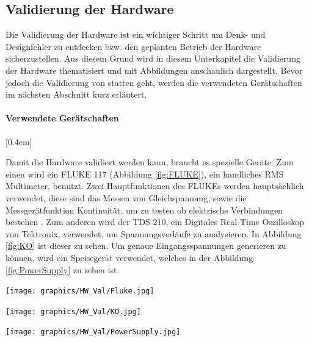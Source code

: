\subsection{Validierung der Hardware}
\label{subsec:validierung_Hardware}
Die Validierung der Hardware ist ein wichtiger Schritt um Denk- und Designfehler zu entdecken bzw. den geplanten Betrieb der Hardware sicherzustellen. Aus diesem Grund wird in diesem Unterkapitel die Validierung der Hardware thematisiert und mit Abbildungen anschaulich dargestellt. Bevor jedoch die Validierung von statten geht, werden die verwendeten Gerätschaften im nächsten Abschnitt kurz erläutert.\\
\paragraph{\textbf{Verwendete Gerätschaften}}[0.4cm]
{\begin{minipage}[b][9cm][t]{0.42\textwidth}
Damit die Hardware validiert werden kann, braucht es spezielle Geräte. Zum einen wird ein FLUKE 117 (Abbildung \ref{fig:FLUKE}), ein handliches RMS Multimeter, benutzt. Zwei Hauptfunktionen des FLUKEs werden hauptsächlich verwendet, diese sind das Messen von Gleichspannung, sowie die Messgerätfunktion Kontinuität, um zu testen ob elektrische Verbindungen bestehen \cite{FLUKE}. Zum anderen wird der TDS 210, ein Digitales Real-Time Oszilloskop von Tektronix, verwendet, um Spannungsverläufe zu analysieren. In Abbildung \ref{fig:KO} ist dieser zu sehen. Um genaue Eingangsspannungen generieren zu können, wird ein Speisegerät verwendet, welches in der Abbildung \ref{fig:PowerSupply} zu sehen ist.
\end{minipage}}
{\begin{minipage}[b][9cm][t]{0.57\textwidth}
\centering
\texttt{[image: graphics/HW\_Val/Fluke.jpg]}
\label{fig:FLUKE}
\end{minipage}}

{\begin{minipage}[b][7cm][t]{0.49\textwidth}
\centering
\texttt{[image: graphics/HW\_Val/KO.jpg]}
\label{fig:KO}
\end{minipage}}
{\begin{minipage}[b][7cm][t]{0.49\textwidth}
\centering
\texttt{[image: graphics/HW\_Val/PowerSupply.jpg]}
\label{fig:PowerSupply}
\end{minipage}}

